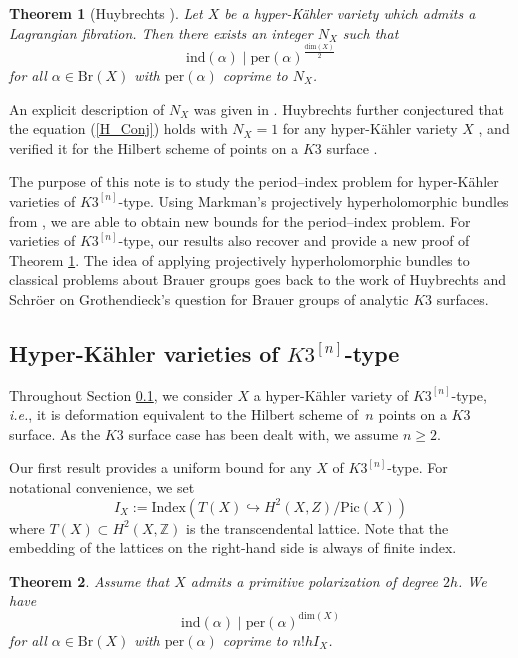 \documentclass[11pt]{amsart}
\theoremstyle{plain}
\newtheorem{thm}{Theorem}[section]
\theoremstyle{definition}
\theoremstyle{remark}
\newcommand{\BZ}{{\mathbb{Z}}}
\begin{document}
\begin{thm}[Huybrechts \cite{H_PI}]\label{thm0.1}
Let $X$ be a hyper-K\"ahler variety which admits a Lagrangian fibration. Then there exists an integer $N_X$ such that
\begin{equation}\label{H_Conj}
\mathrm{ind}(\alpha) \mid \mathrm{per}(\alpha)^{\frac{\mathrm{dim}(X)}{2}}
\end{equation}
for all $\alpha \in \mathrm{Br}(X)$ with $\mathrm{per}(\alpha)$ coprime to $N_X$.
\end{thm}

An explicit description of $N_X$ was given in \cite[(0.1)]{H_PI}. Huybrechts further conjectured that the equation (\ref{H_Conj}) holds with $N_X =1$ for any hyper-K\"ahler variety $X$ \cite[Conjecture 0.2]{H_PI}, and verified it for the Hilbert scheme of points on a $K3$ surface \cite[Theorem 0.4]{H_PI}. 


The purpose of this note is to study the period--index problem for hyper-K\"ahler varieties of $K3^{[n]}$-type. 
Using Markman's projectively hyperholomorphic bundles from \cite{Markman}, we are able to obtain new bounds for the period--index problem. For varieties of $K3^{[n]}$-type, our results also recover and provide a new proof of Theorem \ref{thm0.1}.
The idea of applying projectively hyperholomorphic bundles to classical problems about Brauer groups goes back to the work of Huybrechts and Schr\"oer \cite{HS} on Grothendieck's question for Brauer groups of analytic $K3$ surfaces. 

\subsection{Hyper-K\"ahler varieties of $K3^{[n]}$-type}\label{sect0.2}

Throughout Section \ref{sect0.2}, we consider $X$ a hyper-K\"ahler variety of $K3^{[n]}$-type, \emph{i.e.}, it is deformation equivalent to the Hilbert scheme of~$n$ points on a $K3$ surface. As the $K3$ surface case has been dealt with, we assume $n \geq 2$.

Our first result provides a uniform bound for any $X$ of $K3^{[n]}$-type. For notational convenience, we set
\[
I_X:= \mathrm{Index}\left( T(X) \hookrightarrow H^2(X,Z)/\mathrm{Pic}(X) \right)
\]
where $T(X) \subset H^2(X, \BZ)$ is the transcendental lattice. Note that the embedding of the lattices on the right-hand side is always of finite index.

\begin{thm}\label{thm0.2}
Assume that $X$ admits a primitive polarization of degree $2h$. We have 
    \begin{equation}\label{weak_bound}
        \mathrm{ind}(\alpha) \mid \mathrm{per}(\alpha)^{\mathrm{dim}(X)}
\end{equation}
for all $\alpha \in \mathrm{Br}(X)$ with $\mathrm{per}(\alpha)$ coprime to $n!hI_X$.  
\end{thm}
\end{document}
